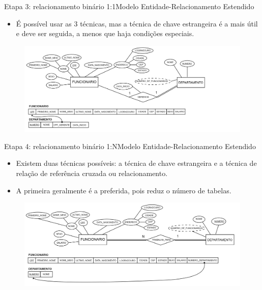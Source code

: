 \documentclass[t]{beamer}
\begin{document}

\begin{ftst}{Etapa 3: relacionamento binário 1:1}{Modelo Entidade-Relacionamento Estendido}
\begin{itemize}
    \item É possível usar as 3 técnicas, mas a técnica de chave estrangeira é a mais útil e deve ser seguida, a menos que haja condições especiais.
\end{itemize}

\begin{figure}
    \centering
    \includegraphics[scale=0.12]{Figuras/03_05.png}
\end{figure}
\end{ftst}


\begin{ftst}{Etapa 4: relacionamento binário 1:N}{Modelo Entidade-Relacionamento Estendido}
\small
\begin{itemize}
    \item Existem duas técnicas possíveis: a técnica de chave estrangeira e a técnica de relação de referência cruzada ou relacionamento. 
    \item A primeira geralmente é a preferida, pois reduz o número de tabelas.
\end{itemize}
\begin{figure}
    \centering
    \includegraphics[scale=0.11]{Figuras/03_09.png}
\end{figure}
\end{ftst}
\end{document}
